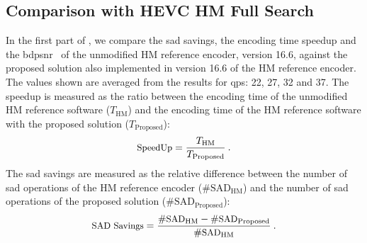 \documentclass{article}
\begin{document}
\subsection{Comparison with HEVC HM Full Search}
\label{sec:vsHM}
\vspace{-0.5em}
In the first part of , we compare the \gls{sad} savings, the encoding time speedup and the \gls{bdpsnr}~\cite{Bjontegaard2001} of the unmodified HM reference encoder, version 16.6, against the proposed solution also implemented in version 16.6 of the HM reference encoder. The values shown are averaged from the results for \glspl{qp}: 22, 27, 32 and 37. The speedup is measured as the ratio between the encoding time of the unmodified HM reference software ($T_{\text{HM}}$) and the encoding time of the HM reference software with the proposed solution ($T_{\text{Proposed}}$):
\begin{equation}
\small{
\text{SpeedUp} = \frac{T_{\text{HM}}}{T_{\text{Proposed}}}\:.
}
\end{equation}
The \gls{sad} savings are measured as the relative difference between the number of \gls{sad} operations of the HM reference encoder ($\#\text{SAD}_{\text{HM}}$) and the number of \gls{sad} operations of the proposed solution ($\#\text{SAD}_{\text{Proposed}}$):
\begin{equation}
\small{
\text{SAD Savings} = \frac{\#\text{SAD}_{\text{HM}} - \#\text{SAD}_{\text{Proposed}}}{\#\text{SAD}_{\text{HM}}}\:.
}
\end{equation}
\end{document}
